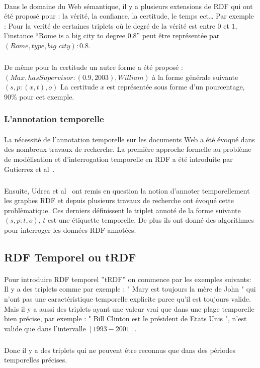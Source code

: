 \documentclass[12pt,a4	]{report}
\begin{document}
\paragraph{}
Dans le domaine du Web sémantique, il y a plusieurs extensions de RDF qui ont été proposé pour : la vérité, la confiance, la certitude, le temps ect…
Par exemple : Pour la verité de certaines triplets où le degré de la vérité est entre $0$ et $1$, l’instance “Rome is a big city to degree 0.8” peut être représentée par $(Rome, type,big{\_}city) : 0.8$.
\subparagraph{}
De même pour la certitude un autre forme a été proposé :
$(Max,hasSupervisor : (0.9,2003),William)$ à la forme générale suivante $(s, p : (x,t),o)$
\newline
La certitude $x$ est représentée sous forme d'un pourcentage, 90\% pour cet exemple.
\subsubsection*{L'annotation temporelle}
\paragraph{}
La nécessité de l’annotation temporelle sur les documents Web a été évoqué dans des nombreux travaux de recherche. La première approche formelle au problème de modélisation et d’interrogation temporelle en RDF a été introduite par Gutierrez et al~\cite{gutierrez2005}.
\subparagraph{}
Ensuite, Udrea et al~\cite{udrea2006} ont remis en question la notion d'annoter temporellement les graphes RDF et depuis plusieurs travaux de recherche ont évoqué cette problèmatique.
Ces derniers définissent le triplet annoté de la forme suivante $(s,p:t,o)$, $t$ est une étiquette temporelle.
De plus ils ont donné des algorithmes pour interroger les données RDF annotées.	

\subsection*{RDF Temporel ou tRDF}
\paragraph{}
Pour introduire RDF temporel ''tRDF'' on commence par les exemples suivants:
\newline
Il y a des triplets comme par exemple : " Mary est toujours la mère de John " qui n'ont pas une caractéristique temporelle explicite parce qu'il est toujours valide. Mais il y a aussi des triplets ayant une valeur vrai que dans une plage temporelle bien précise, par exemple : " Bill Clinton est le président de Etats Unis ", n'est valide que dans l'intervalle $[1993-2001]$.
\subparagraph{}
Donc il y a des triplets qui ne peuvent être reconnus que dans des périodes temporelles précises.
\end{document}
